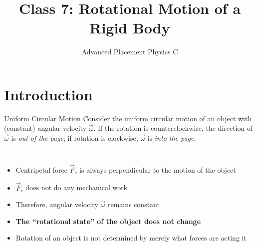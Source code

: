 \documentclass[12pt,compress,aspectratio=169]{beamer}
\title{Class 7: Rotational Motion of a Rigid Body}
\subtitle{Advanced Placement Physics C}
\begin{document}
\begin{frame}
  \maketitle
\end{frame}


\section{Introduction}

\begin{frame}{Uniform Circular Motion}
  Consider the uniform circular motion of an object with (constant) angular
  velocity $\vec\omega$. If the rotation is counterclockwise, the direction of
  $\vec\omega$ is \emph{out of the page}; if rotation is clockwise,
  $\vec\omega$ is \emph{into the page}.
  \begin{columns}
    \centering

    \begin{itemize}
    \item Centripetal force $\vec F_c$ is always perpendicular to the
      motion of the object
    \item $\vec F_c$ does not do any mechanical work
    \item Therefore, angular velocity $\vec\omega$ remains constant
    \item\textbf{The ``rotational state'' of the object does not change}
    \item Rotation of an object is not determined by merely what forces are
      acting it
    \end{itemize}
  \end{columns}
\end{frame}
\end{document}

